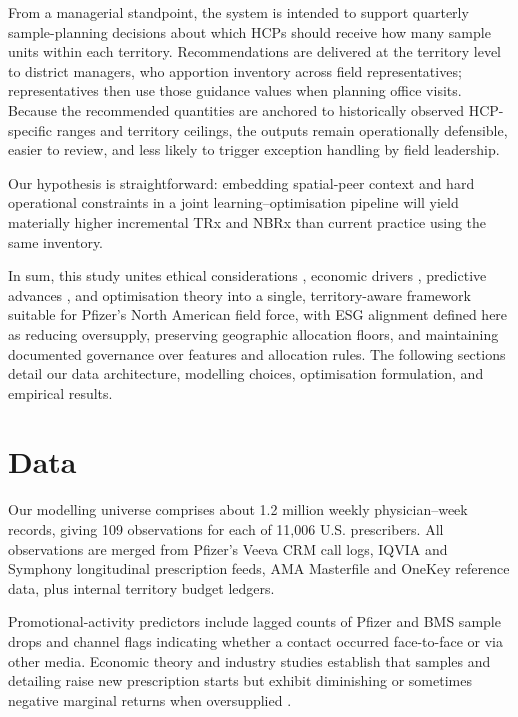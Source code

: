 From a managerial standpoint, the system is intended to support quarterly sample-planning decisions about which HCPs should receive how many sample units within each territory. Recommendations are delivered at the territory level to district managers, who apportion inventory across field representatives; representatives then use those guidance values when planning office visits. Because the recommended quantities are anchored to historically observed HCP-specific ranges and territory ceilings, the outputs remain operationally defensible, easier to review, and less likely to trigger exception handling by field leadership.

Our hypothesis is straightforward: embedding spatial-peer context and hard operational constraints in a joint learning--optimisation pipeline will yield materially higher incremental TRx and NBRx than current practice using the same inventory.

In sum, this study unites ethical considerations \citep{Malik2020}, economic drivers \citep{Schwartz2019,RajputPandey2022}, predictive advances \citep{Chamberlain2022,Liuetal2022,Antonazzoetal2022}, and optimisation theory \citep{JosephMantrala2009,MontoyaNetzerJedidi2010,IQVIA2025} into a single, territory-aware framework suitable for Pfizer's North American field force, with ESG alignment defined here as reducing oversupply, preserving geographic allocation floors, and maintaining documented governance over features and allocation rules. The following sections detail our data architecture, modelling choices, optimisation formulation, and empirical results.

\section{Data}\label{sec:data}

Our modelling universe comprises about 1.2 million weekly physician--week records, giving 109 observations for each of 11,006 U.S. prescribers. All observations are merged from Pfizer's Veeva CRM call logs, IQVIA and Symphony longitudinal prescription feeds, AMA Masterfile and OneKey reference data, plus internal territory budget ledgers.

Promotional-activity predictors include lagged counts of Pfizer and BMS sample drops and channel flags indicating whether a contact occurred face-to-face or via other media. Economic theory and industry studies establish that samples and detailing raise new prescription starts but exhibit diminishing or sometimes negative marginal returns when oversupplied \citep{JosephMantrala2009,Gonul2001,DonohueCevascoRosenthal2018,MontoyaNetzerJedidi2010}.

